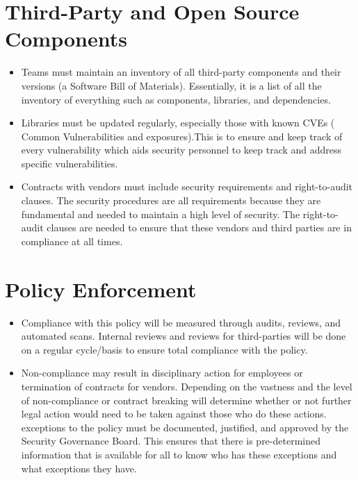 \section{Third-Party and Open Source Components}
\begin{itemize}
    \item Teams must maintain an inventory of all third-party components and their versions (a Software Bill of Materials). Essentially, it is a list of all the inventory of everything such as components, libraries, and dependencies.
    \item Libraries must be updated regularly, especially those with known CVEs ( Common Vulnerabilities and exposures).This is to ensure and keep track of every vulnerability which aids security personnel to keep track and address specific vulnerabilities.
    \item Contracts with vendors must include security requirements and right-to-audit clauses. The security procedures are all requirements because they are fundamental and needed to maintain a high level of security. The right-to-audit clauses are needed to ensure that these vendors and third parties are in compliance at all times.
\end{itemize}
\section{Policy Enforcement}
\begin{itemize}
    \item Compliance with this policy will be measured through audits, reviews, and automated scans. Internal reviews and reviews for third-parties will be done on a regular cycle/basis to ensure total compliance with the policy.
    \item Non-compliance may result in disciplinary action for employees or termination of contracts for vendors. Depending on the vastness and the level of non-compliance or contract breaking will determine whether or not further legal action would need to be taken against those who do these actions.
    \itemAny exceptions to the policy must be documented, justified, and approved by the Security Governance Board. This ensures that there is pre-determined information that is available for all to know who has these exceptions and what exceptions they have.
\end{itemize}\
